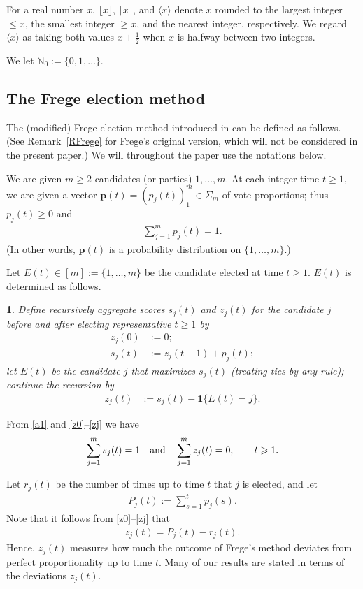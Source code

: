 \documentclass[11pt,reqno,tbtags,a4paper]{amsart}
\numberwithin{equation}{section}
\renewcommand\le{\leq}
\renewcommand\ge{\geq}
\renewcommand\leq{\leqslant}
\renewcommand\geq{\geqslant}
\theoremstyle{plain}%
\newtheorem*{method}{\MethodName}
\theoremstyle{definition}
\theoremstyle{remark}
\newcommand{\refR}[1]{Remark~\ref{#1}}
\newcommand{\sumjm}{\sum_{j=1}^m}
\newcommand\set[1]{\ensuremath{\{#1\}}}
\newcommand\xcpar[1]{\{#1\}}
\newcommand\ceil[1]{\lceil#1\rceil}
\newcommand\floor[1]{\lfloor#1\rfloor}
\newcommand\round[1]{\langle#1\rangle}
\newcommand\bbN{\mathbb N}
\newcommand\gS{\Sigma}
\newcommand\indic[1]{\boldsymbol1\xcpar{#1}}
\newcommand\vp{\mathbf{p}}
\newcommand\bbNo{\bbN_0}
\newcommand\0{{\boldsymbol 0}}
\newcommand\1{{\boldsymbol 1}}
\begin{document}
For a real number $x$, $\floor x$, $\ceil x$, and $\round x$ denote $x$
rounded to the largest integer $\le x$, the smallest integer $\ge x$, 
and the nearest integer, respectively. We regard $\round x$ as taking both
values $x\pm\frac12$ when $x$ is halfway between two integers.

We let $\bbNo:=\set{0,1,\dots}$. 

\subsection{The Frege election method}\label{SSFrege}

The (modified) Frege election method introduced  in \cite{HLL}
can be defined as follows.
(See \refR{RFrege} for Frege's original version, which will not be
considered in the present paper.)
We will throughout the paper use the notations below.

We are given $m\ge2$ candidates (or parties) $1,\dots,m$.
At each integer time $t\ge1$, we are given a vector 
$\vp(t)=(p_j(t))_1^m\in\gS_m$ of vote proportions;
thus $p_j(t)\ge0$ and
\begin{align}\label{a1}
  \sumjm p_j(t)=1.
\end{align}
(In other words, $\vp(t)$ is a probability distribution on \set{1,\dots,m}.)

Let $E(t)\in[m]:=\set{1,\dots,m}$ be the candidate elected at time $t\ge1$.
$E(t)$ is determined as follows.

\def\MethodName{Frege's method}
\begin{method}
Define recursively aggregate scores $s_j(t)$ and $z_j(t)$ for the candidate $j$
before and after electing representative $t\ge1$ by
\begin{align}\label{z0}
  z_j(0)&:=0;\\
s_j(t)&:=z_j(t-1)+p_j(t);\label{sj}%
\end{align}
%
let $E(t)$ be the candidate $j$ that maximizes $s_j(t)$
(treating ties by any rule);
continue the recursion by
\begin{align}
z_j(t)&:=s_j(t)-\indic{E(t)=j}.\label{zj}
\end{align}
\end{method}

From \eqref{a1} and \eqref{z0}--\eqref{zj} we have
\begin{align}\label{sumsum}
\sumjm s_j(t)=1
\text{\quad and\quad}
  \sumjm z_j(t)=0,
\qquad t\ge1.
\end{align}

Let $r_j(t)$ be the number of times up to time $t$ that $j$ is elected, and
let
\begin{align}
  \label{Sj}
P_j(t):=\sum_{s=1}^t p_j(s).
\end{align}
Note that it follows from \eqref{z0}--\eqref{zj} that
\begin{align}\label{rj}
  z_j(t) = P_j(t)-r_j(t).
\end{align}
Hence, $z_j(t)$ measures how much the outcome of Frege's method deviates
from perfect proportionality up to time $t$.
Many of our results are stated in terms of the deviations $z_j(t)$.
\end{document}
